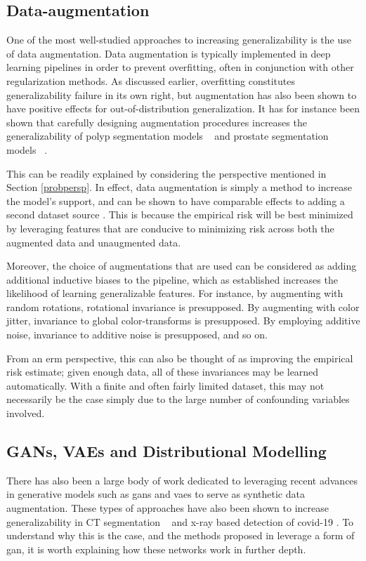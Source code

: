 \subsection{Data-augmentation}
One of the most well-studied approaches to increasing generalizability is the use of data augmentation. Data augmentation is typically
implemented in deep learning pipelines in order to prevent overfitting, often in conjunction with other regularization methods. As discussed earlier, overfitting constitutes generalizability failure in its own right, but augmentation has also been shown to have positive effects for out-of-distribution generalization. It has for instance been shown that carefully designing augmentation procedures increases the generalizability of polyp segmentation models ~\cite{polyp_augmentation} and prostate segmentation models ~\cite{augmentation_prostate}. 

This can be readily explained by considering the perspective mentioned in Section \ref{probpersp}. In effect, data augmentation is simply a method to increase the model's support, and can be shown to have comparable effects to adding a second dataset source \cite{generalization_datamod}.  This is because the empirical risk will be best minimized by leveraging features that are conducive to minimizing risk across both the augmented data and unaugmented data. 

Moreover, the choice of augmentations that are used can be considered as adding additional inductive biases to the pipeline, which as established increases the likelihood of learning generalizable features. For instance, by augmenting with random rotations, rotational invariance is presupposed. By augmenting with color jitter, invariance to global color-transforms is presupposed.  By employing additive noise, invariance to additive noise is presupposed, and so on. 

From an \gls{erm} perspective, this can also be thought of as improving the empirical risk estimate; given enough data, all of these invariances may be learned automatically. With a finite and often fairly limited dataset, this may not necessarily be the case simply due to the large number of confounding variables involved. 

\subsection{GANs, VAEs and Distributional Modelling}

There has also been a large body of work dedicated to leveraging recent advances in generative models such as \glspl{gan} and \glspl{vae} to serve as synthetic data augmentation. These types of approaches have also been shown to increase generalizability in CT segmentation ~\cite{cyclegan} and x-ray based detection of covid-19 \cite{covid}. To understand why this is the case, and the methods proposed in  leverage a form of \gls{gan}, it is worth explaining how these networks work in further depth.
